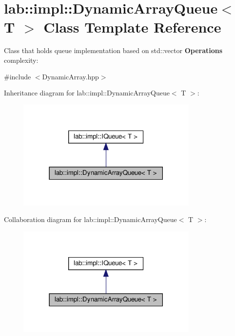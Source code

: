 \hypertarget{classlab_1_1impl_1_1DynamicArrayQueue}{}\section{lab\+:\+:impl\+:\+:Dynamic\+Array\+Queue$<$ T $>$ Class Template Reference}
\label{classlab_1_1impl_1_1DynamicArrayQueue}


Class that holds queue implementation based on std\+::vector {\bfseries Operations} complexity\+:  




{\ttfamily \#include $<$Dynamic\+Array.\+hpp$>$}



Inheritance diagram for lab\+:\+:impl\+:\+:Dynamic\+Array\+Queue$<$ T $>$\+:
\nopagebreak
\begin{figure}[H]
\begin{center}
\leavevmode
\includegraphics[width=254pt]{classlab_1_1impl_1_1DynamicArrayQueue__inherit__graph}
\end{center}
\end{figure}


Collaboration diagram for lab\+:\+:impl\+:\+:Dynamic\+Array\+Queue$<$ T $>$\+:
\nopagebreak
\begin{figure}[H]
\begin{center}
\leavevmode
\includegraphics[width=254pt]{classlab_1_1impl_1_1DynamicArrayQueue__coll__graph}
\end{center}
\end{figure}

